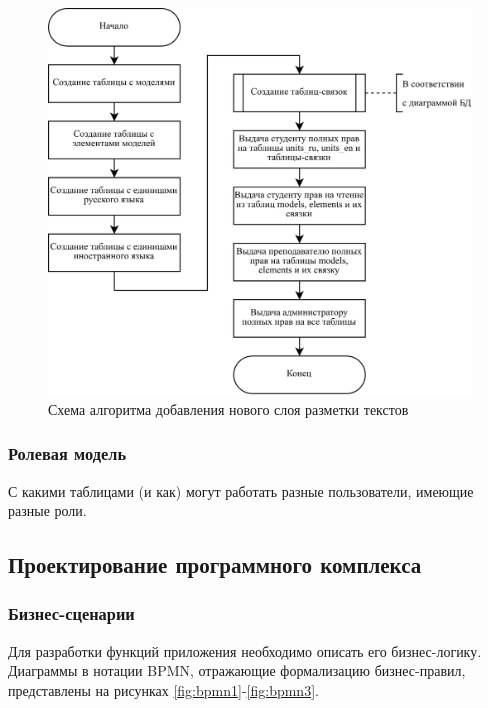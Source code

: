 \begin{figure}[h]
	\centering
	\includegraphics[width=\textwidth ]{img/procedure_algorithm/procedure_algorithm.drawio.png}
	\caption{Схема алгоритма добавления нового слоя разметки текстов}
	\label{fig:proc_alg}
\end{figure} 

\clearpage

\subsubsection{Ролевая модель}

С какими таблицами (и как) могут работать разные пользователи, имеющие разные роли.



\subsection{Проектирование программного комплекса}

\subsubsection{Бизнес-сценарии}

Для разработки функций приложения необходимо описать его бизнес-логику.
Диаграммы в нотации BPMN, отражающие формализацию бизнес-правил, представлены на рисунках \ref{fig:bpmn1}-\ref{fig:bpmn3}. 


